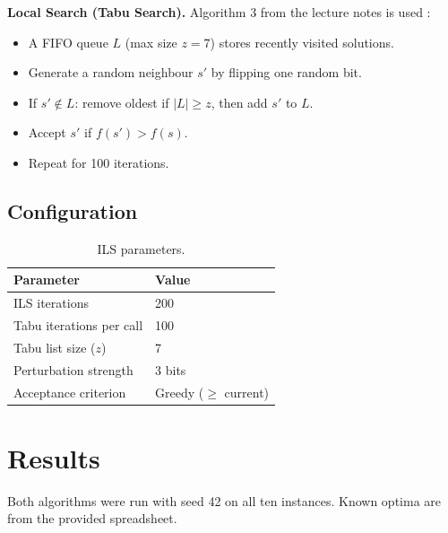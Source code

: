 \documentclass[12pt, a4paper]{article}
\begin{document}
\textbf{Local Search (Tabu Search).} Algorithm 3 from the lecture notes is used \cite{notes}:

\begin{itemize}
    \item A FIFO queue $L$ (max size $z = 7$) stores recently visited solutions.
    \item Generate a random neighbour $s'$ by flipping one random bit.
    \item If $s' \notin L$: remove oldest if $|L| \geq z$, then add $s'$ to $L$.
    \item Accept $s'$ if $f(s') > f(s)$.
    \item Repeat for 100 iterations.
\end{itemize}

\subsection{Configuration}

\begin{table}[h]
\centering
\begin{tabular}{ll}
\toprule
\textbf{Parameter} & \textbf{Value} \\
\midrule
ILS iterations              & 200 \\
Tabu iterations per call    & 100 \\
Tabu list size ($z$)        & 7 \\
Perturbation strength       & 3 bits \\
Acceptance criterion        & Greedy ($\geq$ current) \\
\bottomrule
\end{tabular}
\caption{ILS parameters.}
\end{table}

\section{Results}

Both algorithms were run with seed 42 on all ten instances. Known optima are from the provided spreadsheet.
\end{document}
